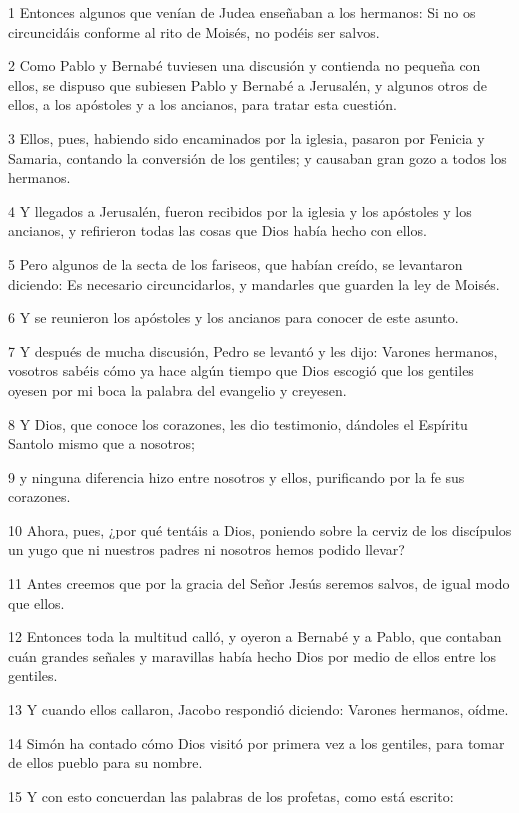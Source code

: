 \par 1 Entonces algunos que venían de Judea enseñaban a los hermanos: Si no os circuncidáis conforme al rito de Moisés, no podéis ser salvos.
\par 2 Como Pablo y Bernabé tuviesen una discusión y contienda no pequeña con ellos, se dispuso que subiesen Pablo y Bernabé a Jerusalén, y algunos otros de ellos, a los apóstoles y a los ancianos, para tratar esta cuestión.
\par 3 Ellos, pues, habiendo sido encaminados por la iglesia, pasaron por Fenicia y Samaria, contando la conversión de los gentiles; y causaban gran gozo a todos los hermanos.
\par 4 Y llegados a Jerusalén, fueron recibidos por la iglesia y los apóstoles y los ancianos, y refirieron todas las cosas que Dios había hecho con ellos.
\par 5 Pero algunos de la secta de los fariseos, que habían creído, se levantaron diciendo: Es necesario circuncidarlos, y mandarles que guarden la ley de Moisés.
\par 6 Y se reunieron los apóstoles y los ancianos para conocer de este asunto.
\par 7 Y después de mucha discusión, Pedro se levantó y les dijo: Varones hermanos, vosotros sabéis cómo ya hace algún tiempo que Dios escogió que los gentiles oyesen por mi boca la palabra del evangelio y creyesen.
\par 8 Y Dios, que conoce los corazones, les dio testimonio, dándoles el Espíritu Santolo mismo que a nosotros;
\par 9 y ninguna diferencia hizo entre nosotros y ellos, purificando por la fe sus corazones.
\par 10 Ahora, pues, ¿por qué tentáis a Dios, poniendo sobre la cerviz de los discípulos un yugo que ni nuestros padres ni nosotros hemos podido llevar?
\par 11 Antes creemos que por la gracia del Señor Jesús seremos salvos, de igual modo que ellos.
\par 12 Entonces toda la multitud calló, y oyeron a Bernabé y a Pablo, que contaban cuán grandes señales y maravillas había hecho Dios por medio de ellos entre los gentiles.
\par 13 Y cuando ellos callaron, Jacobo respondió diciendo: Varones hermanos, oídme.
\par 14 Simón ha contado cómo Dios visitó por primera vez a los gentiles, para tomar de ellos pueblo para su nombre.
\par 15 Y con esto concuerdan las palabras de los profetas, como está escrito:
